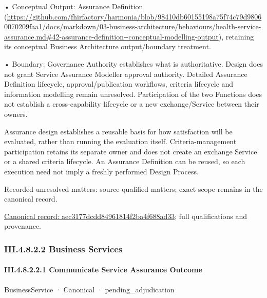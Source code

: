 •
Conceptual Output: Assurance Definition (\url{https://github.com/fhirfactory/harmonia/blob/98410db60155198a75f74c79d98060070209faa1/docs/markdown/03-business-architecture/behaviours/health-service-assurance.md#42-assurance-definition--conceptual-modelling-output}), retaining its conceptual Business Architecture output/boundary treatment.



•
Boundary: Governance Authority establishes what is authoritative. Design does not grant Service Assurance Modeller approval authority. Detailed Assurance Definition lifecycle, approval/publication workflows, criteria lifecycle and information modelling remain unresolved. Participation of the two Functions does not establish a cross-capability lifecycle or a new exchange/Service between their owners.



Assurance design establishes a reusable basis for how satisfaction will be evaluated, rather than running the evaluation itself. Criteria-management participation retains its separate owner and does not create an exchange Service or a shared criteria lifecycle. An Assurance Definition can be reused, so each execution need not imply a freshly performed Design Process.


{\small Recorded unresolved matters: source-qualified matters; exact scope remains in the canonical record.}\par
{\footnotesize \href{../../../../continuum/business/business-process/aec3177dcdd84961814f2ba4f688ad33.md}{Canonical record: aec3177dcdd84961814f2ba4f688ad33}; full qualifications and provenance.}\par
\subsubsection*{III.4.8.2.2 Business Services}
\label{navigation:III.4.8.2.2}

\paragraph*{III.4.8.2.2.1 Communicate Service Assurance Outcome}
\label{navigation:III.4.8.2.2.1}

\label{element:371b04d6bbf84b53a3c5667ae6df2809}
{\small BusinessService · Canonical · pending\_adjudication}\par

